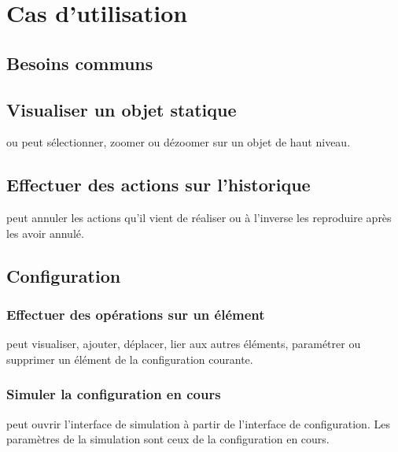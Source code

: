 
\section{Cas d'utilisation}

\subsection{Besoins communs}
\subsection{Visualiser un objet statique}
 ou  peut sélectionner, zoomer ou dézoomer sur un objet de haut niveau.

\subsection{Effectuer des actions sur l'historique}
 peut annuler les actions qu'il vient de réaliser ou à l'inverse les reproduire après les avoir annulé.

\subsection{Configuration}
\subsubsection{Effectuer des opérations sur un élément}
 peut visualiser, ajouter, déplacer, lier aux autres éléments, paramétrer ou supprimer un élément de la configuration courante.

\subsubsection{Simuler la configuration en cours}
 peut ouvrir l'interface de simulation à partir de l'interface de configuration. Les paramètres de la simulation sont ceux de la configuration en cours.

